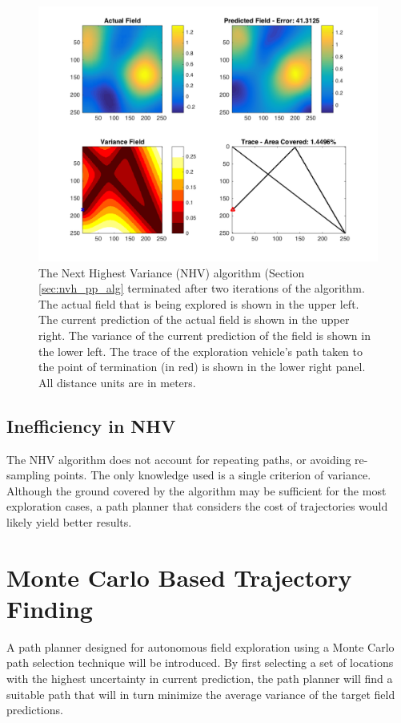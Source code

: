 \begin{figure}[hb!]
	\centering
	\includegraphics[width=0.95\linewidth]{figures/nhv_4panel.png}
    \captionsetup{skip=0.20\baselineskip}
	\ssp
	\caption{The Next Highest Variance (NHV) algorithm (Section \ref{sec:nvh_pp_alg} terminated after two iterations of the algorithm. The actual field that is being explored is shown in the upper left. The current prediction of the actual field is shown in the upper right. The variance of the current prediction of the field is shown in the lower left. The trace of the exploration vehicle's path taken to the point of termination (in red) is shown in the lower right panel. All distance units are in meters.}
	\label{fig:nhv_pp}
\end{figure}

\subsection{Inefficiency in NHV}
The NHV algorithm does not account for repeating paths, or avoiding re-sampling points. The only knowledge used is a single criterion of variance. Although the ground covered by the algorithm may be sufficient for the most exploration cases, a path planner that considers the cost of trajectories would likely yield better results.

\section{Monte Carlo Based Trajectory Finding} \label{sec:mcpp}
A path planner designed for autonomous field exploration using a Monte Carlo path selection technique will be introduced. By first selecting a set of locations with the highest uncertainty in current prediction, the path planner will find a suitable path that will in turn minimize the average variance of the target field predictions.

